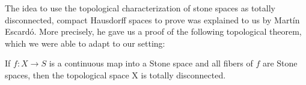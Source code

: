 The idea to use the topological characterization of stone spaces as totally disconnected, compact Hausdorff spaces to prove  was explained to us by Martín Escardó. More precisely, he gave us a proof of the following topological theorem, which we were able to adapt to our setting:

\begin{theorem*}
  If $f : X \to S$ is a continuous map into a Stone space and all fibers of $f$ are Stone spaces, then the topological space X is totally disconnected.
\end{theorem*}
